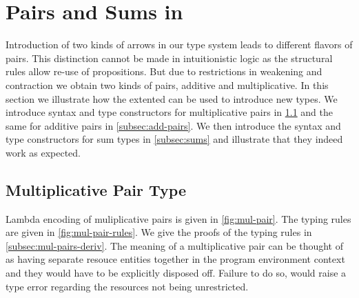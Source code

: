 
\section{Pairs and Sums in  \qub{}}\label{sec:pairs-types}
Introduction of two kinds of arrows in our type system leads to different flavors of pairs. This distinction cannot be made
in intuitionistic logic as the structural rules allow re-use of propositions. But due to restrictions in weakening and
contraction we obtain two kinds of pairs, additive and multiplicative. In this section we illustrate how the
extented \qub{} can be used to introduce new types. We introduce syntax and type constructors for multiplicative pairs in \cref{subsec:mul-pairs}
and the same for additive pairs in \cref{subsec:add-pairs}. We then introduce the
syntax and type constructors for sum types in \cref{subsec:sums} and illustrate that they indeed work as expected.

\subsection{Multiplicative Pair Type}\label{subsec:mul-pairs}
Lambda encoding of muliplicative pairs is given in \cref{fig:mul-pair}. The typing rules
are given in \cref{fig:mul-pair-rules}. We give the proofs of the typing rules in \cref{subsec:mul-pairs-deriv}.
The meaning of a multiplicative pair can be thought of as
having separate resouce entities together in the program environment context and they would have to be
explicitly disposed off. Failure to do so, would raise a type error regarding the resources
not being unrestricted.

